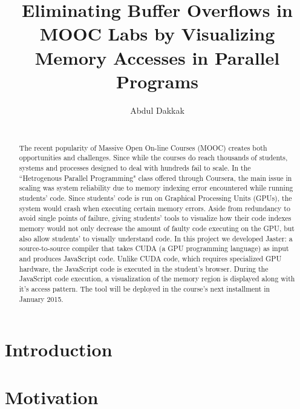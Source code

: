 \documentclass[nocopyrightspace]{sigchi}
\begin{document}
\title{Eliminating Buffer Overflows in MOOC Labs by Visualizing Memory Accesses in Parallel Programs}

\author{
  \alignauthor Abdul Dakkak\\
    \\
    }

\maketitle

\begin{abstract}
  The recent popularity of Massive Open On-line Courses (MOOC) creates
  both opportunities and challenges. Since while the courses do reach
  thousands of students, systems and processes designed to deal with
  hundreds fail to scale. In the ``Hetrogenous Parallel Programming" class
  offered through Coursera, the main issue in scaling was system reliability due
  to memory indexing error encountered while running students' code.
  Since students' code is run on Graphical Processing Units (GPUs), the system
  would crash when executing certain memory errors. Aside from redundancy to avoid
  single points of failure, giving students' tools to visualize how their code
  indexes memory would not only decrease the amount of faulty code executing on
  the GPU, but also allow students' to visually understand code.
  In this project we developed Jaster: a source-to-source compiler that takes
  CUDA (a GPU programming language) as input and produces JavaScript code.
  Unlike CUDA code, which requires
  specialized GPU hardware, the JavaScript code is executed
  in the student's browser. During the JavaScript code execution, a visualization
  of the memory region is displayed along with it's access pattern.
  The tool will be deployed in the course's next installment in January 2015.
\end{abstract}


\section{Introduction}



\section{Motivation}
\end{document}
